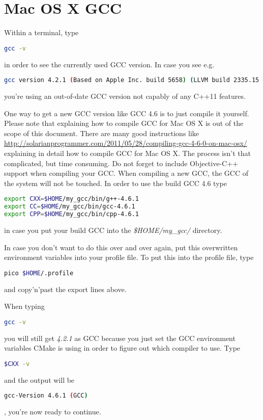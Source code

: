 \chapter{Mac OS X GCC}
\label{Appendix:MacOSX_GCC}
Within a terminal, type
\begin{lstlisting}[language=sh]
gcc -v
\end{lstlisting}
in order to see the currently used \ac{GCC} version. In case you see e.g.
\begin{lstlisting}[language=sh]
gcc version 4.2.1 (Based on Apple Inc. build 5658) (LLVM build 2335.15.00)
\end{lstlisting}
you're using an out-of-date \ac{GCC} version not capably of any C++11 features.

One way to get a new \ac{GCC} version like \ac{GCC} 4.6 is to just compile it yourself. Please note that explaining how to compile \ac{GCC} for Mac OS X is out of the scope of this document. There are many good instructions like \url{http://solarianprogrammer.com/2011/05/28/compiling-gcc-4-6-0-on-mac-osx/} explaining in detail how to compile \ac{GCC} for Mac OS X. The process isn't that complicated, but time consuming. Do not forget to include Objective-C++ support when compiling your \ac{GCC}. When compiling a new \ac{GCC}, the \ac{GCC} of the system will not be touched. In order to use the build \ac{GCC} 4.6 type
\begin{lstlisting}[language=sh]
export CXX=$HOME/my_gcc/bin/g++-4.6.1
export CC=$HOME/my_gcc/bin/gcc-4.6.1
export CPP=$HOME/my_gcc/bin/cpp-4.6.1
\end{lstlisting}
in case you put your build \ac{GCC} into the \emph{\$HOME/my\_gcc/} directory.

In case you don't want to do this over and over again, put this overwritten environment variables into your profile file. To put this into the profile file, type
\begin{lstlisting}[language=sh]
pico $HOME/.profile
\end{lstlisting}
and copy'n'past the export lines above.

When typing
\begin{lstlisting}[language=sh]
gcc -v
\end{lstlisting}
you will still get \emph{4.2.1} as \ac{GCC} because you just set the \ac{GCC} environment variables CMake is using in order to figure out which compiler to use. Type
\begin{lstlisting}[language=sh]
$CXX -v
\end{lstlisting}
and the output will be
\begin{lstlisting}[language=sh]
gcc-Version 4.6.1 (GCC)
\end{lstlisting}
, you're now ready to continue.
